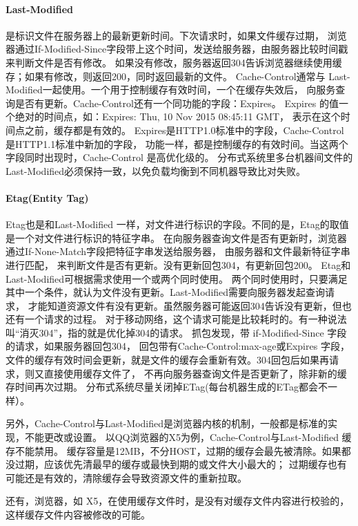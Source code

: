 \documentclass{book}
\begin{document}
\paragraph{Last-Modified}是标识文件在服务器上的最新更新时间。下次请求时，如果文件缓存过期，
浏览器通过If-Modified-Since字段带上这个时间，发送给服务器，由服务器比较时间戳来判断文件是否有修改。
如果没有修改，服务器返回304告诉浏览器继续使用缓存；如果有修改，则返回200，同时返回最新的文件。
Cache-Control通常与 Last-Modified一起使用。一个用于控制缓存有效时间，一个在缓存失效后，
向服务查询是否有更新。Cache-Control还有一个同功能的字段：Expires。
Expires 的值一个绝对的时间点，如：Expires: Thu, 10 Nov 2015 08:45:11 GMT，
表示在这个时间点之前，缓存都是有效的。
Expires是HTTP1.0标准中的字段，Cache-Control是HTTP1.1标准中新加的字段，
功能一样，都是控制缓存的有效时间。当这两个字段同时出现时，Cache-Control 是高优化级的。
分布式系统里多台机器间文件的Last-Modified必须保持一致，以免负载均衡到不同机器导致比对失败。

\paragraph{Etag(Entity Tag)}Etag也是和Last-Modified 一样，对文件进行标识的字段。不同的是，Etag的取值是一个对文件进行标识的特征字串。
在向服务器查询文件是否有更新时，浏览器通过If-None-Match字段把特征字串发送给服务器，
由服务器和文件最新特征字串进行匹配，
来判断文件是否有更新。没有更新回包304，有更新回包200。
Etag和Last-Modified可根据需求使用一个或两个同时使用。
两个同时使用时，只要满足其中一个条件，就认为文件没有更新。Last-Modified需要向服务器发起查询请求，
才能知道资源文件有没有更新。虽然服务器可能返回304告诉没有更新，但也还有一个请求的过程。
对于移动网络，这个请求可能是比较耗时的。有一种说法叫“消灭304”，指的就是优化掉304的请求。
抓包发现，带 if-Modified-Since 字段的请求，如果服务器回包304，
回包带有Cache-Control:max-age或Expires 字段，
文件的缓存有效时间会更新，就是文件的缓存会重新有效。304回包后如果再请求，则又直接使用缓存文件了，
不再向服务器查询文件是否更新了，除非新的缓存时间再次过期。
分布式系统尽量关闭掉ETag(每台机器生成的ETag都会不一样）。

另外，Cache-Control与Last-Modified是浏览器内核的机制，一般都是标准的实现，不能更改或设置。
以QQ浏览器的X5为例，Cache-Control与Last-Modified 缓存不能禁用。
缓存容量是12MB，不分HOST，过期的缓存会最先被清除。如果都没过期，应该优先清最早的缓存或最快到期的或文件大小最大的；
过期缓存也有可能还是有效的，清除缓存会导致资源文件的重新拉取。

还有，浏览器，如 X5，在使用缓存文件时，是没有对缓存文件内容进行校验的，这样缓存文件内容被修改的可能。
\end{document}
